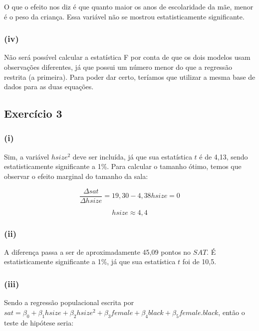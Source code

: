\documentclass[hidelinks,11pt]{book}
\theoremstyle{definition}
\begin{document}
O que o efeito nos diz é que quanto maior os anos de escolaridade da mãe, menor é o peso da criança. Essa variável não se mostrou estatisticamente significante.

\subsubsection*{(iv)}

Não será possível calcular a estatística F por conta de que os dois modelos usam observações diferentes, já que possui um número menor do que a regressão restrita (a primeira). Para poder dar certo, teríamos que utilizar a mesma base de dados para as duas equações.


\subsection*{Exercício 3}

\subsubsection*{(i)}

Sim, a variável $hsize^2$ deve ser incluída, já que sua estatística $t$ é de 4,13, sendo estatisticamente significante a 1\%. Para calcular o tamanho ótimo, temos que observar o efeito marginal do tamanho da sala:

\begin{displaymath}
	\frac{\Delta sat}{\Delta hsize} = 19,30 - 4,38 hsize = 0
\end{displaymath}

\begin{displaymath}
	hsize \approx 4,4
\end{displaymath}


\subsubsection*{(ii)}

A diferença passa a ser de aproximadamente 45,09 pontos no $SAT$. É estatisticamente significante a 1\%, já que sua estatística $t$ foi de 10,5.

\subsubsection*{(iii)}



Sendo a regressão populacional escrita por $ sat = \beta_0 + \beta_1 hsize + \beta_2 hsize^2 + \beta_3 female + \beta_4 black + \beta_5 female . black$, então o teste de hipótese seria:
\end{document}
